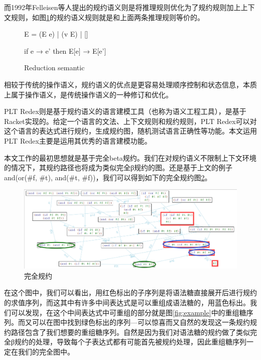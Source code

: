 而1992年Felleisen等人提出的规约语义则是将推理规则优化为了规约规则加上上下文规则，如图\ref{fig:felleisen}的规约语义规则就是和上面两条推理规则等价的。


		\begin{figure}[ht]
			\centering 
			E = (E e) | (v E) | []
			
			if e → e' then E[e] → E[e']
			\caption{Reduction semantic}
			\label{fig:felleisen}
		\end{figure}  


相较于传统的操作语义，规约语义的优点是更容易处理顺序控制和状态信息，本质上属于操作语义，是传统操作语义的一种修订和优化。

PLT Redex则是基于规约语义的语言建模工具（也称为语义工程工具），是基于Racket实现的。给定一个语言的文法、上下文规则和规约规则，PLT Redex可以对这个语言的表达式进行规约，生成规约图，随机测试语言正确性等功能。本文运用PLT Redex主要是运用其优秀的语言建模功能。


本文工作的最初思想就是基于完全beta规约。我们在对规约语义不限制上下文环境的情况下，其规约路径也将成为类似完全β规约的图。还是基于上文的例子and(or(\#f, \#t), and(\#t, \#f))，我们可以得到如下的完全规约图\ref{fig:full_reduction}。

\begin{figure}[ht]
	\centering
	\includegraphics[width=14cm]{images/chapter2/fullreduction.png}
	\caption{完全规约}
	\label{fig:full_reduction}
\end{figure}

在这个图中，我们可以看出，用{\color[rgb]{1,0,0}红色}标出的子序列是将语法糖直接展开后进行规约的求值序列，而这其中有许多中间表达式是可以重组成语法糖的，用{\color[rgb]{0,0,1}蓝色}标出。我们可以发现，在这个中间表达式中可重组的部分就是图\ref{fig:example}中的重组糖序列。而又可以在图中找到{\color[rgb]{0,1,0}绿色}标出的序列---可以惊喜而又自然的发现这一条规约规约路径包含了我们想要的重组糖序列。自然是因为我们对语法糖的规约做了类似完全β规约的处理，导致每个子表达式都有可能首先被规约处理，因此重组糖序列一定在我们的完全图中。

